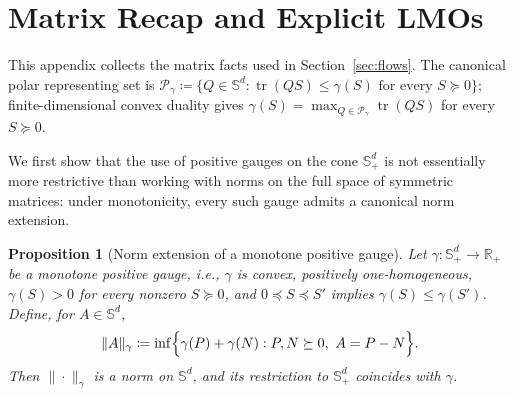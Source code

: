 \documentclass{article}
\newtheorem{proposition}[theorem]{Proposition}
\newcommand{\R}{\mathbb{R}}
\newcommand{\tr}{\operatorname{tr}}
\newcommand{\cPol}{\mathcal P_\gamma}
\begin{document}



\appendix

\section{Matrix Recap and Explicit LMOs}
\label{app:matrix-recap}
This appendix collects the matrix facts used in Section~\ref{sec:flows}. The canonical polar representing set is $\cPol\coloneqq\{Q\in\mathbb S^d:\tr(QS)\le\gamma(S)\text{ for every }S\succeq0\}$; finite-dimensional convex duality gives $\gamma(S)=\max_{Q\in\cPol}\tr(QS)$ for every $S\succeq0$.

We first show that the use of positive gauges on the cone
$\mathbb S_+^d$ is not essentially more restrictive than working with norms on
the full space of symmetric matrices: under monotonicity, every such gauge
admits a canonical norm extension.

\begin{proposition}[Norm extension of a monotone positive gauge]
\label{prop:gauge-norm-extension}
Let $\gamma:\mathbb S_+^d\to\R_+$ be a monotone positive gauge, i.e.,
$\gamma$ is convex, positively one-homogeneous, $\gamma(S)>0$ for every
nonzero $S\succeq0$, and $0\preceq S\preceq S'$ implies
$\gamma(S)\le\gamma(S')$. Define, for $A\in\mathbb S^d$,
\[
    \|A\|_\gamma
    \coloneqq
    \inf\Bigl\{
        \gamma(P)+\gamma(N):
        P,N\succeq0,\ A=P-N
    \Bigr\}.
\]
Then $\|\cdot\|_\gamma$ is a norm on $\mathbb S^d$, and its restriction to
$\mathbb S_+^d$ coincides with $\gamma$.
\end{proposition}
\end{document}

